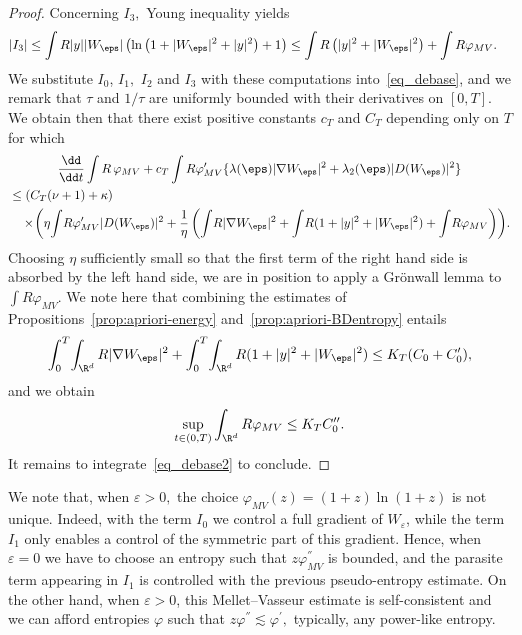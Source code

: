 \begin{proof}
Concerning $I_3,$ Young inequality yields
\begin{align*}
|I_3| & \le \int R |y| |W_\eps| \left(\ln\left(1+|W_\eps|^2 + |y|^2\right) + 1\right)
\le \int R \left(|y|^2 + |W_\eps|^2\right) + \int R \varphi_{MV}.
\end{align*}
We substitute $I_0$, $I_1,$ $I_2$ and $I_3$ with these computations into~\eqref{eq_debase}, and we remark that $\tau$ and $1/\tau$ are uniformly bounded with their derivatives on $[0,T].$ We obtain then that there exist positive constants $c_{T}$ and $C_T$ depending only on $T$ for which
\begin{multline}\label{eq_debase2}
\dfrac{\dd }{\dd t}\int R \, \varphi_{MV} + c_T \int R \varphi'_{MV} \{ \lambda(\eps) |\nabla W_\eps|^2 + \lambda_2(\eps) |D(W_\eps)|^2 \}\\
\begin{aligned}
&\le \left(C_T(\nu +1) + \kappa\right) \\
&\quad\times\!\left(\eta\!\int\! R \varphi'_{MV}|D(W_\eps)|^2 +
\dfrac{1}{\eta} \left(\int\! R|\nabla W_\eps|^2 + \int\! R(1+|y|^2 +|W_\eps|^2) + \int\! R \varphi_{MV} \right) \right)\!.
\end{aligned}
\end{multline}
Choosing $\eta$ sufficiently small so that the first term of the right hand side is absorbed by the left hand side, we are in position to apply a Gr\"onwall lemma to $\int R \varphi_{MV}.$ We note here that combining the estimates of Propositions~\ref{prop:apriori-energy} and~\ref{prop:apriori-BDentropy} entails
\[
\int_0^T \!\int_{\R^d} R |\nabla W_\eps|^2 + \int_0^T \! \int_{\R^d} R(1 +|y|^2 + |W_\eps|^2) \le K_T (C_0 + C'_0),
\]
and we obtain
\[
\sup_{t \in (0,T)} \int_{\R^d} R \varphi_{MV} \le K_T C''_0.
\]
It remains to integrate~\eqref{eq_debase2} to conclude.
\end{proof}

\begin{rema}
We note that, when $\varepsilon >0,$ the choice $\varphi_{MV}(z) = (1+z)\ln(1+z)$ is not unique. Indeed, with the term $I_0$ we control a full gradient of $W_{\varepsilon}$, while the term $I_1$ only enables a control of the symmetric part of this gradient. Hence, when $\varepsilon =0$ we have to choose an entropy such that $z
\varphi^{''}_{MV}$ is bounded, and the parasite term appearing in $I_1$ is controlled with the previous pseudo-entropy estimate. On the other hand, when $\varepsilon >0$, this Mellet--Vasseur estimate is self-consistent and we can afford entropies $\varphi$ such that $z \varphi^{''} \lesssim \varphi^{'},$ typically, any power-like entropy.
\end{rema}

